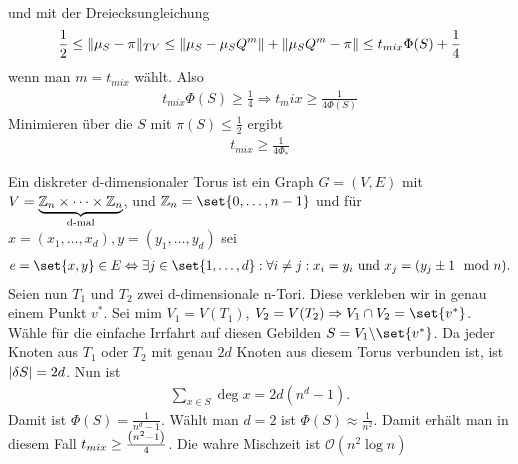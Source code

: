 \begin{beweis}
\begin{align}
 	\end{align}
 	und mit der Dreiecksungleichung 
 	\begin{align}
 		\frac{1}{2} \leq \lVert \mu_S - \pi \rVert_{TV} \leq \lVert \mu_S - \mu_SQ^m \rVert + \lVert \mu_SQ^m-\pi \rVert \leq t_{mix}\Phi(S) + \frac{1}{4}
  	\end{align}
  	wenn man $m = t_{mix}$ wählt. Also
  	\begin{align}
  		t_{mix} \Phi(S) \geq \frac{1}{4} \Rightarrow t_mix \geq \frac{1}{4\Phi(S)}
  	\end{align}
  	Minimieren über die $S$ mit $\pi(S) \leq \frac{1}{2}$ ergibt 
  	\begin{align}
  		t_{mix} \geq \frac{1}{4\Phi_*}
  	\end{align}
\end{beweis}

\begin{beispiel}
	Ein diskreter d-dimensionaler Torus ist ein Graph $G = (V,E)$ mit $V = \underbrace{\mathbb{Z}_n \times \dots \times \mathbb{Z}_n}_{\text{d-mal}}$, und $\ZZ_n = \set{0,\dots,n-1}$ und für $x = (x_1,\dots,x_d), y = (y_1,\dots,y_d)$ sei 
	\begin{align}
		e = \set{x,y} \in E \Leftrightarrow \exists j \in \set{1,\dots,d} :\forall i \neq j: x_i = y_i  \text{ und } x_j = (y_j \pm 1 \mod{n}).
	\end{align} 
	Seien nun $T_1$ und $T_2$ zwei d-dimensionale n-Tori. Diese verkleben wir in genau einem Punkt $v^*$. Sei mim $V_1 = V(T_1)$, $V_2 = V(T_2) \Rightarrow V_1 \cap V_2 = \set{v^*}$. Wähle für die einfache Irrfahrt auf diesen Gebilden $S = V_1\backslash \set{v^*}$. Da jeder Knoten aus $T_1$ oder $T_2$ mit genau $2d$ Knoten aus diesem Torus verbunden ist, ist $\lvert\delta S\rvert = 2d$. Nun ist 
	\begin{align}
		\sum\limits_{x \in S} \deg{x} = 2d(n^d-1). 
	\end{align}
	Damit ist $\Phi(S) = \frac{1}{n^d - 1}$. Wählt man $d = 2$ ist $\Phi(S) \approx \frac{1}{n^2}$. Damit erhält man in diesem Fall $t_{mix} \geq \frac{\left(n^2-1\right)}{4}$. Die wahre Mischzeit ist $\mathcal{O}(n^2 \log n)$
\end{beispiel}

